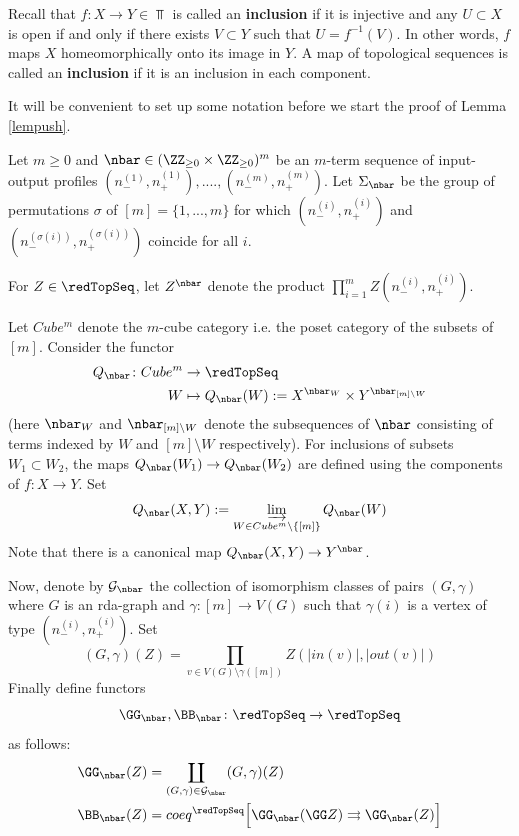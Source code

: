 \documentclass[a4paper,10pt]{amsart}
\begin{document}
Recall that $f \colon X \to Y \in \Top$ is called an \textbf{inclusion} if it is injective and any $U \subset X$ is open if and only if there exists $V \subset Y$ such that $U = f^{-1}(V)$. In other words, $f$ maps $X$ homeomorphically onto its image in $Y$. A map of topological sequences is called an \textbf{inclusion} if it is an inclusion in each component.

It will be convenient to set up some notation before we start the proof of Lemma \ref{lempush}.
\begin{notation}
	Let $m \geq 0$ and $\nbar \in (\ZZ_{\geq 0} \times \ZZ_{\geq 0})^m$ be an $m$-term sequence of input-output profiles $(n_-^{(1)},n_+^{(1)}),....,(n_-^{(m)},n_+^{(m)})$. Let $\Sigma_{\nbar}$ be the group of permutations $\sigma$ of $[m]=\{1,...,m\}$ for which $(n_-^{(i)},n_+^{(i)})$ and $(n_-^{(\sigma(i))},n_+^{(\sigma(i))})$ coincide for all $i$.
	
	For $Z \in \redTopSeq$, let $Z^{\nbar}$ denote the product $\prod_{i=1}^m Z(n_-^{(i)},n_+^{(i)})$.
	
	Let $Cube^m$ denote the $m$-cube category i.e. the poset category of the subsets of $[m]$. Consider the functor 
	\begin{align*}
		Q_{\nbar} \colon Cube^m & \to \redTopSeq\\
		W &\mapsto Q_{\nbar}(W) := X^{\nbar_W} \times Y^{\nbar_{[m] \setminus W}}
	\end{align*}
	(here $\nbar_{W}$ and $\nbar_{[m] \setminus W}$ denote the subsequences of $\nbar$ consisting of terms indexed by $W$ and $[m] \setminus W$ respectively). For inclusions of subsets $W_1 \subset W_2$, the maps $Q_{\nbar}(W_1) \to Q_{\nbar}(W_2)$ are defined using the components of $f \colon X \to Y$. Set
	\[ Q_{\nbar}(X,Y) := \varinjlim_{W \in Cube^m \setminus \{[m]\}} Q_{\nbar}(W) \]
	Note that there is a canonical map $Q_{\nbar}(X,Y) \to Y^{\nbar}$.
	
	Now, denote by $\mathcal{G}_{\nbar}$ the collection of isomorphism classes of pairs $(G,\gamma)$ where $G$ is an rda-graph and $\gamma \colon [m] \to V(G)$ such that $\gamma(i)$ is a vertex of type $(n_-^{(i)},n_+^{(i)})$.
	 Set 
	\[ (G,\gamma)(Z) = \prod_{v\in V(G) \setminus \gamma([m])} Z(|in(v)|,|out(v)|) \]
	Finally define functors 
	\[ \GG_{\nbar}, \BB_{\nbar} \colon \redTopSeq \to \redTopSeq \]
	as follows:
	\begin{align*} 
	\GG_{\nbar}(Z) &= \coprod_{(G,\gamma) \in \mathcal{G}_{\nbar}} (G,\gamma)(Z) \\
	\BB_{\nbar}(Z) &= coeq^{\redTopSeq}\Big[ \GG_{\nbar}(\GG Z) \rightrightarrows \GG_{\nbar}(Z) \Big]
	\end{align*}
\end{notation}
\end{document}
